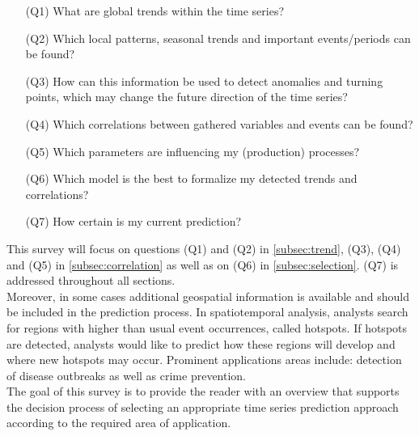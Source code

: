 \documentclass[electronic]{vgtc}             %
\begin{document}
\begin{enumerate}
	\itemsep0em 
	\item[(Q1)] What are global trends within the time series?
	\item[(Q2)] Which local patterns, seasonal trends and important events/periods can be found?
	\item[(Q3)] How can this information be used to detect anomalies and turning points, which may change the future direction of the time series?
	\item[(Q4)] Which correlations between gathered variables and events can be found?
	\item[(Q5)] Which parameters are influencing my (production) processes?
	\item[(Q6)] Which model is the best to formalize my detected trends and correlations?
	\item[(Q7)] How certain is my current prediction? 
\end{enumerate}
This survey will focus on questions (Q1) and (Q2) in \autoref{subsec:trend}, (Q3), (Q4) and (Q5) in \autoref{subsec:correlation} as well as on (Q6) in \autoref{subsec:selection}.
(Q7) is addressed throughout all sections.\\
Moreover, in some cases additional geospatial information is available and should be included in the prediction process. 
In spatiotemporal analysis, analysts search for regions with higher than usual event occurrences, called hotspots.
If hotspots are detected, analysts would like to predict how these regions will develop and where new hotspots may occur.
Prominent applications areas include: detection of disease outbreaks as well as crime prevention. \\
The goal of this survey is to provide the reader with an overview that supports  the decision process of selecting an appropriate time series prediction approach according to the required area of application.
\end{document}

